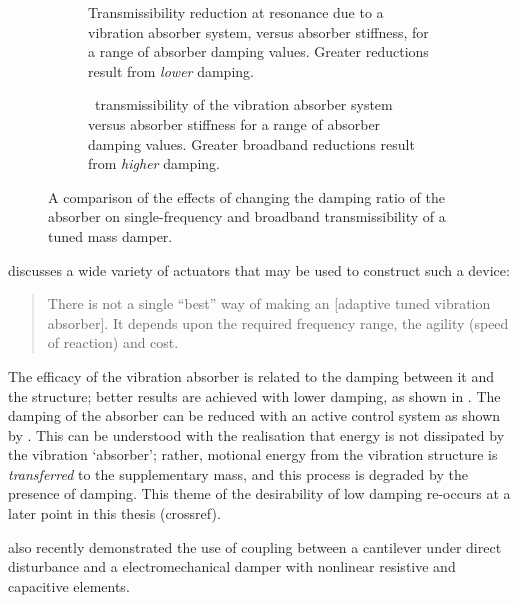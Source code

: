 \begin{figure}
\begin{wide}
  \begin{subfigure}
    \caption{Transmissibility reduction at resonance due to a vibration 
    absorber system, versus absorber stiffness, for a range of absorber 
    damping values. Greater reductions result from \emph{lower} damping.}
  \end{subfigure}
  \begin{subfigure}
    \caption{\RMS\ transmissibility of the vibration absorber system versus 
    absorber stiffness for a range of absorber damping values. Greater 
    broadband reductions result from \emph{higher} damping.}
  \end{subfigure}
\end{wide}
\caption{A comparison of the effects of changing the damping ratio of the 
absorber on single-frequency and broadband transmissibility of a tuned mass 
damper.}
\end{figure}

\textcite{brennan2006} discusses a wide variety of actuators that may
be used to construct such a device:
\begin{quote}
  There is not a single ``best'' way of making an [adaptive tuned
  vibration absorber]. It depends upon the required frequency range,
  the agility (speed of reaction) and cost.
\end{quote}

The efficacy of the vibration absorber is related to the damping between it
and the structure; better results are achieved with lower damping, as shown in
. The damping of the absorber can be reduced with an
active control system as shown by \textcite{kidner1998}. This can be
understood with the realisation that energy is not dissipated by the vibration
`absorber'; rather, motional energy from the vibration structure is
\emph{transferred} to the supplementary mass, and this process is degraded by
the presence of damping. This theme of the desirability of low damping
re-occurs at a later point in this thesis (crossref).

\textcite{felix2008} also recently demonstrated the use of coupling between a
cantilever under direct disturbance and a electromechanical damper with
nonlinear resistive and capacitive elements.

